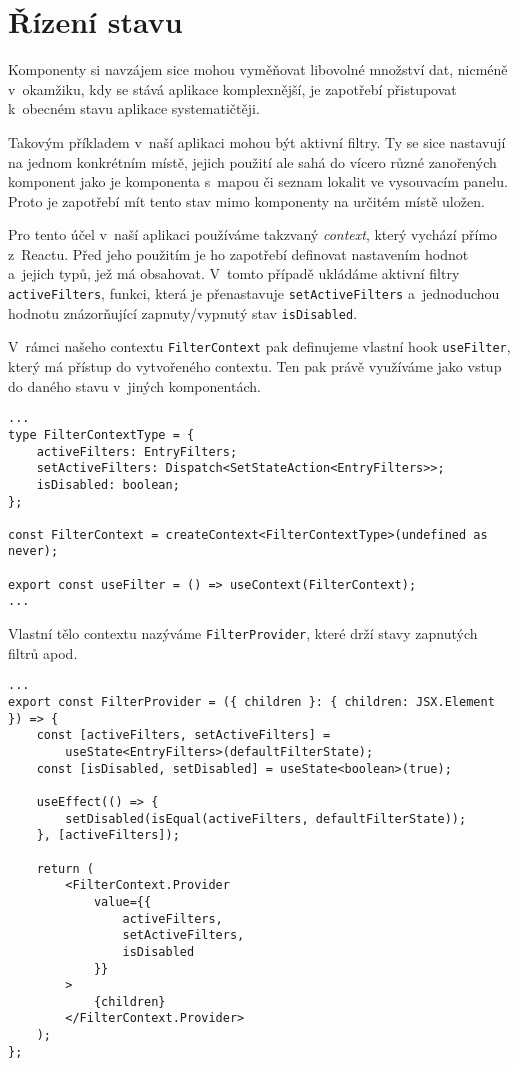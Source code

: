 \hypertarget{ux159uxedzenuxed-stavu}{%
\section{Řízení stavu}\label{ux159uxedzenuxed-stavu}}

Komponenty si navzájem sice mohou vyměňovat libovolné množství dat, nicméně v~okamžiku, kdy se stává aplikace komplexnější, je zapotřebí přistupovat k~obecném stavu aplikace systematičtěji.

Takovým příkladem v~naší aplikaci mohou být aktivní filtry. Ty se sice nastavují na jednom konkrétním místě, jejich použití ale sahá do vícero různé zanořených komponent jako je komponenta s~mapou či seznam lokalit ve vysouvacím panelu. Proto je zapotřebí mít tento stav mimo komponenty na určitém místě uložen.

Pro tento účel v~naší aplikaci používáme takzvaný \emph{context}, který vychází přímo z~Reactu. Před jeho použitím je ho zapotřebí definovat nastavením hodnot a~jejich typů, jež má obsahovat. V~tomto případě ukládáme aktivní filtry \verb|activeFilters|, funkci, která je přenastavuje \verb|setActiveFilters| a~jednoduchou hodnotu znázorňující zapnuty/vypnutý stav \verb|isDisabled|.

V~rámci našeho contextu \verb|FilterContext| pak definujeme vlastní hook \verb|useFilter|, který má přístup do vytvořeného contextu. Ten pak právě využíváme jako vstup do daného stavu v~jiných komponentách.

\begin{verbatim}
...
type FilterContextType = {
    activeFilters: EntryFilters;
    setActiveFilters: Dispatch<SetStateAction<EntryFilters>>;
    isDisabled: boolean;
};

const FilterContext = createContext<FilterContextType>(undefined as never);

export const useFilter = () => useContext(FilterContext);
...
\end{verbatim}

Vlastní tělo contextu nazýváme \verb|FilterProvider|, které drží stavy zapnutých filtrů apod.

\begin{verbatim}
...
export const FilterProvider = ({ children }: { children: JSX.Element }) => {
    const [activeFilters, setActiveFilters] =
        useState<EntryFilters>(defaultFilterState);
    const [isDisabled, setDisabled] = useState<boolean>(true);

    useEffect(() => {
        setDisabled(isEqual(activeFilters, defaultFilterState));
    }, [activeFilters]);

    return (
        <FilterContext.Provider
            value={{
                activeFilters,
                setActiveFilters,
                isDisabled
            }}
        >
            {children}
        </FilterContext.Provider>
    );
};
\end{verbatim}

